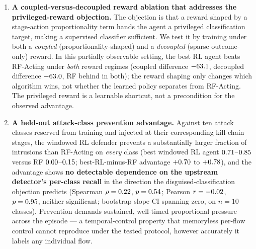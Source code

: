 \begin{enumerate}
    \item \textbf{A coupled-versus-decoupled reward ablation that addresses the privileged-reward objection.} The objection is that a reward shaped by a stage-action proportionality term hands the agent a privileged classification target, making a supervised classifier sufficient. We test it by training under both a \emph{coupled} (proportionality-shaped) and a \emph{decoupled} (sparse outcome-only) reward. In this partially observable setting, the best RL agent beats RF-Acting under \emph{both} reward regimes (coupled difference $-63.1{}$, decoupled difference $-63.0{}$, RF behind in both); the reward shaping only changes which algorithm wins, not whether the learned policy separates from RF-Acting. The privileged reward is a learnable shortcut, not a precondition for the observed advantage.

    \item \textbf{A held-out attack-class prevention advantage.} Against ten attack classes reserved from training and injected at their corresponding kill-chain stages, the windowed RL defender prevents a substantially larger fraction of intrusions than RF-Acting on \emph{every} class (best windowed RL agent $0.71$--$0.85$ versus RF $0.00$--$0.15$; best-RL-minus-RF advantage $+0.70$ to $+0.78$), and the advantage shows \textbf{no detectable dependence on the upstream detector's per-class recall} in the direction the disguised-classification objection predicts (Spearman $\rho = 0.22$, $p = 0.54$; Pearson $r = -0.02$, $p = 0.95$, neither significant; bootstrap slope CI spanning zero, on $n=10$ classes). Prevention demands sustained, well-timed proportional pressure across the episode --- a temporal-control property that memoryless per-flow control cannot reproduce under the tested protocol, however accurately it labels any individual flow.


\end{enumerate}
